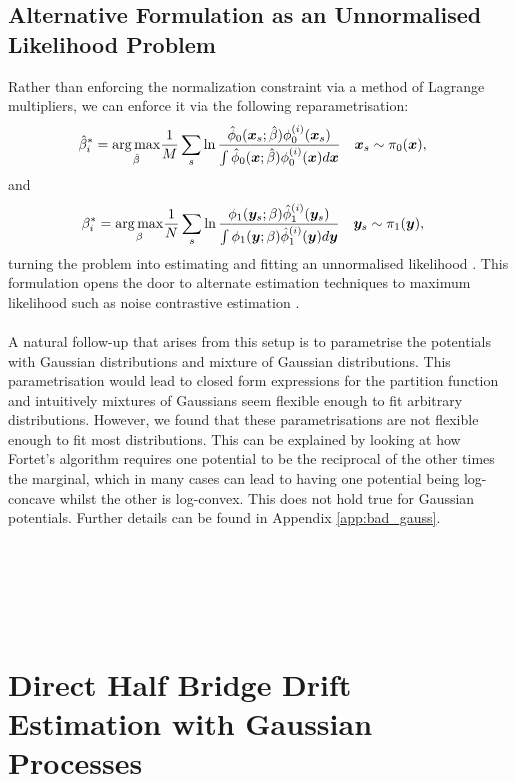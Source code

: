 \documentclass[a4paper,12pt,twoside,openright]{report}
\theoremstyle{definition}
\begin{document}
\subsection{Alternative Formulation as an Unnormalised Likelihood Problem}\label{sec:unormfit}
Rather than enforcing the normalization constraint via a method of Lagrange multipliers, we can enforce it via the following reparametrisation:
\begin{align}
    \hat{\beta}^*_i = \operatorname*{arg\,max}_{\hat{\beta} } &\frac{1}{M} \sum_s \operatorname{ln} \frac{{\hat{\phi}}_0({\bm{x}}_s; \hat{\beta} )   \phi_0^{(i)}({\bm{x}}_s)}{ \int {\hat{\phi}}_0({\bm{x}}; \hat{\beta} )   \phi_0^{(i)}({\bm{x}}) d{\bm{x}}}
    \quad {\bm{x}}_s\sim \pi_0({\bm{x}}), \nonumber 
\end{align}
and
\begin{align}
    {\beta}^*_i = \operatorname*{arg\,max}_{{\beta} } &\frac{1}{N} \sum_s \operatorname{ln}\frac{ \phi_1({\bm{y}}_s; {\beta} )   {\hat{\phi}}_1^{(i)}({\bm{y}}_s)}{ \int \phi_1({\bm{y}}; {\beta} )   {\hat{\phi}}_1^{(i)}({\bm{y}}) d{\bm{y}} }
    \quad {\bm{y}}_s\sim \pi_1({\bm{y}}), \nonumber 
\end{align}
turning the problem into estimating and fitting an unnormalised likelihood \citep{gutmann2010noise}. This formulation opens the door to alternate estimation techniques to maximum likelihood such as noise contrastive estimation \citep{gutmann2010noise}. 
\\~\\
A natural follow-up that arises from this setup is to parametrise the potentials with Gaussian distributions and mixture of Gaussian distributions. This parametrisation would lead to closed form expressions for the partition function and intuitively mixtures of Gaussians seem flexible enough to fit arbitrary distributions. However, we found that these parametrisations are not flexible enough to fit most distributions. This can be explained by looking at how Fortet's algorithm requires one potential to be the reciprocal of the other times the marginal, which in many cases can lead to having one potential being log-concave whilst the other is log-convex. This does not hold true for Gaussian potentials. Further details can be found in Appendix \ref{app:bad_gauss}.
\\~\\\\~\\\\~\\

\section{Direct Half Bridge Drift Estimation with Gaussian Processes}
\end{document}
